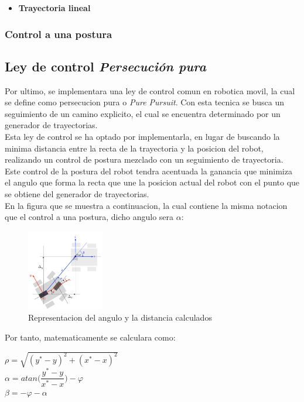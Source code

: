 \documentclass[a4paper,twoside]{article}
\begin{document}
	\begin{itemize}
		\item \textbf{Trayectoria lineal}
		
	\end{itemize}
	
	
	\subsubsection{Control a una postura}

\newpage

\subsection{Ley de control \textit{Persecución pura}}
Por ultimo, se implementara una ley de control comun en robotica movil, la cual se define como persecucion pura o \textit{Pure Pursuit}. Con esta tecnica se busca un seguimiento de un camino explicito, el cual se encuentra determinado por un generador de trayectorias.\\
Esta ley de control se ha optado por implementarla, en lugar de buscando la minima distancia entre la recta de la trayectoria y la posicion del robot, realizando un control de postura mezclado con un seguimiento de trayectoria. \\
Este control de la postura del robot tendra acentuada la ganancia que minimiza el angulo que forma la recta que une la posicion actual del robot con el punto que se obtiene del generador de trayectorias.\\
En la figura que se muestra a continuacion, la cual contiene la misma notacion que el control a una postura, dicho angulo sera $\alpha$:

\begin{figure}[h!]
   \centering
   \includegraphics[width=0.3\textwidth]{postura}
   \caption{Representacion del angulo y la distancia calculados}
\end{figure}

Por tanto, matematicamente se calculara como:
\begin{center}
$\rho=\sqrt{(y^*-y)^2+(x^*-x)^2}$ \\
$\alpha=atan\Big(\dfrac{y^*-y}{x^*-x}\Big)-\varphi$ \\
$\beta=-\varphi-\alpha$
\end{center}
\end{document}
